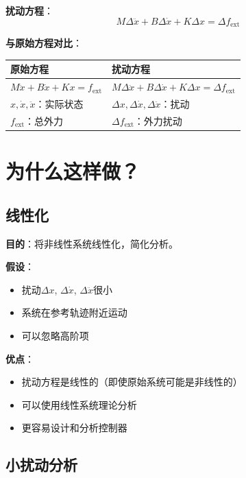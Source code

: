 \documentclass[12pt,a4paper]{article}
\begin{document}
\textbf{扰动方程}：
\begin{equation}
M\Delta \ddot{x} + B\Delta \dot{x} + K\Delta x = \Delta f_{\text{ext}}
\end{equation}

\textbf{与原始方程对比}：

\begin{center}
\begin{tabular}{|l|l|}
\hline
\textbf{原始方程} & \textbf{扰动方程} \\
\hline
$M\ddot{x} + B\dot{x} + Kx = f_{\text{ext}}$ & $M\Delta \ddot{x} + B\Delta \dot{x} + K\Delta x = \Delta f_{\text{ext}}$ \\
\hline
$x, \dot{x}, \ddot{x}$：实际状态 & $\Delta x, \Delta \dot{x}, \Delta \ddot{x}$：扰动 \\
\hline
$f_{\text{ext}}$：总外力 & $\Delta f_{\text{ext}}$：外力扰动 \\
\hline
\end{tabular}
\end{center}

\section{为什么这样做？}

\subsection{线性化}

\textbf{目的}：将非线性系统线性化，简化分析。

\textbf{假设}：
\begin{itemize}
\item 扰动$\Delta x$, $\Delta \dot{x}$, $\Delta \ddot{x}$很小
\item 系统在参考轨迹附近运动
\item 可以忽略高阶项
\end{itemize}

\textbf{优点}：
\begin{itemize}
\item 扰动方程是线性的（即使原始系统可能是非线性的）
\item 可以使用线性系统理论分析
\item 更容易设计和分析控制器
\end{itemize}

\subsection{小扰动分析}
\end{document}
